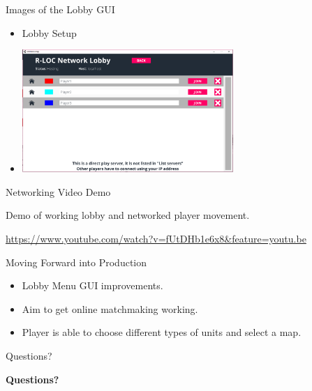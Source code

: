 \documentclass{beamer}
\begin{document}
\begin{frame}{Images of the Lobby GUI}
	\begin{itemize}
		\item Lobby Setup \pause
		\item \includegraphics[width=8cm]{LobbySetup}
	\end{itemize}
\end{frame}

\begin{frame}{Networking Video Demo}
	\begin{center}
	Demo of working lobby and networked player movement.
	\par
		\url{https://www.youtube.com/watch?v=fUtDHb1e6x8&feature=youtu.be}
	\end{center}
\end{frame}

\begin{frame}{Moving Forward into Production}
	\begin{itemize}
		\item Lobby Menu GUI improvements. \pause
		\item Aim to get online matchmaking working. \pause
		\item Player is able to choose different types of units and select a map.
	\end{itemize}
\end{frame}
\begin{frame}{Questions?}
\begin{center}
\textbf{Questions?}
\end{center}
\end{frame}
\end{document}

